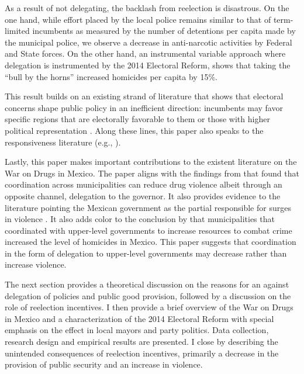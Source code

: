 \documentclass[12pt]{amsart}
\numberwithin{equation}{section}
\theoremstyle{definition}
\theoremstyle{definition}
\theoremstyle{definition}
\begin{document}
As a result of not delegating, the backlash from reelection is disastrous. On the one hand, while effort placed by the local police remains similar to that of term-limited incumbents as measured by the number of detentions per capita made by the municipal police, we observe a decrease in anti-narcotic activities by Federal and State forces. On the other hand, an instrumental variable approach where delegation is instrumented by the 2014 Electoral Reform, shows that taking the ``bull by the horns'' increased homicides per capita by 15\%. 

This result builds on an existing strand of literature that shows that electoral concerns shape public policy in an inefficient direction: incumbents may favor specific regions that are electorally favorable to them \citep{schady_2000, Miguel_zaidi_2003, cole_2004, khemani_2007} or those with higher political representation  \citep{wright_1974, porto_2001, ansolabehere_etal_2002}. Along these lines, this paper also speaks to the responsiveness literature (e.g., \citet{besley_burges_2002}). 

Lastly, this paper makes important contributions to the existent literature on the War on Drugs in Mexico. The paper aligns with the findings from \citet{durante_gutierrez_2013} that found that coordination across municipalities can reduce drug violence albeit through an opposite channel, delegation to the governor. It also provides evidence to the literature pointing the Mexican government as the partial responsible for surges in violence \citep{escalante_2011, guerrero_2011}. It also adds color to the conclusion by \citet{dell_2015} that municipalities that coordinated with upper-level governments to increase resources to combat crime increased the level of homicides in Mexico. This paper suggests that coordination in the form of delegation to upper-level governments may decrease rather than increase violence.  

The next section provides a theoretical discussion on the reasons for an against delegation of policies and public good provision, followed by a discussion on the role of reelection incentives. I then provide a brief overview of the War on Drugs in Mexico and a characterization of the 2014 Electoral Reform with special emphasis on the effect in local mayors and party politics. Data collection, research design and empirical results are presented. I close by describing the unintended consequences of reelection incentives, primarily a decrease in the provision of public security and an increase in violence.
     
\end{document}
